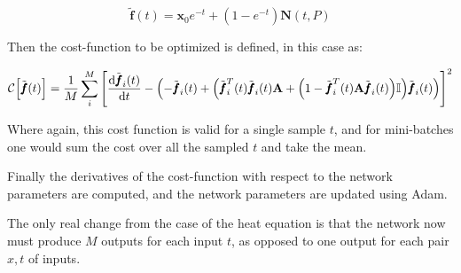 \documentclass[reprint, english, nofootinbib]{revtex4-2}
\begin{document}
\begin{equation}
    \tilde{\pmb f}(t) = \pmb x_0 e^{-t} + (1 - e^{-t}) \pmb N(t, P)
\end{equation}

Then the cost-function to be optimized is defined, in this case as:

\begin{widetext}
\begin{equation}
    \mathcal C\qty[\tilde{\pmb f}(t)] = \frac{1}{M}\sum_{i}^M \qty[ 
    \dv{\tilde{\pmb f}_i(t)}{t} - \qty(- \tilde{\pmb f}_i(t) + \qty(\tilde{\pmb f}_i^T(t)\tilde{\pmb f}_i(t) \mathbf{A} + 
    \qty(1 - \tilde{\pmb f}^T_i(t) \mathbf{A} \tilde{\pmb f}_i(t)) \mathbb I) \tilde{\pmb f}_i(t))]^2
\end{equation}
\end{widetext}
Where again, this cost function is valid for a single sample $t$, and for mini-batches one would sum the cost over all the sampled $t$ and take the mean.

Finally the derivatives of the cost-function with respect to the network parameters are computed, and the network parameters are updated using Adam.

The only real change from the case of the heat equation is that the network now must produce $M$ outputs for each input $t$, as opposed to one output for each pair $x,t$ of inputs.
\end{document}
